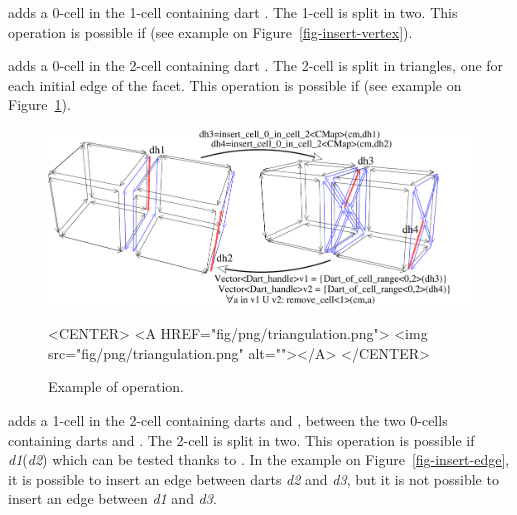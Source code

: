  adds a 0-cell in
the 1-cell containing dart . The 1-cell is split in two. This
operation is possible if \myin{} (see
example on Figure~\ref{fig-insert-vertex}).

 adds a 0-cell in
the 2-cell containing dart . The 2-cell is split in
triangles, one for each initial edge of the facet. This operation
is possible if \myin{} (see example on
Figure~\ref{fig-triangulate}).

\begin{figure}[htb]
  \begin{ccTexOnly}
    \centerline{\includegraphics[width=.85\textwidth]
      {Combinatorial_map/fig/pdf/triangulation}}
  \end{ccTexOnly}
  \begin{ccHtmlOnly}
    <CENTER> <A HREF="fig/png/triangulation.png"> <img
    src="fig/png/triangulation.png" alt=""></A> </CENTER>
  \end{ccHtmlOnly}
  \caption{Example of  operation.}
  \label{fig-triangulate}
\end{figure}

 adds a 1-cell in
the 2-cell containing darts  and , between the two
0-cells containing darts  and . The 2-cell is split
in two. This operation is possible if \emph{d1}\myin{}\orbit{\betaun{}}(\emph{d2})
which can be tested thanks to
.  In the example on
Figure~\ref{fig-insert-edge}, it is possible to insert an edge
between darts \emph{d2} and \emph{d3}, but it is
not possible to insert an edge between \emph{d1} and \emph{d3}.

